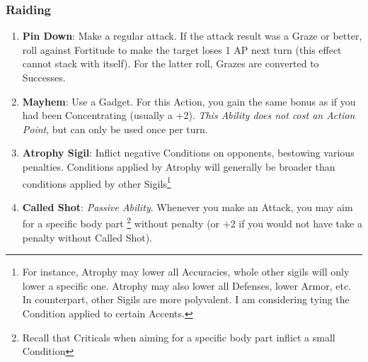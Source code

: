 \subsubsection{Raiding}
\begin{enumerate}
    \item \textbf{Pin Down}: Make a regular attack. If the attack result was a Graze or better, roll against Fortitude to make the target loses 1 AP next turn (this effect cannot stack with itself). For the latter roll, Grazes are converted to Successes.
    \item \textbf{Mayhem}: Use a Gadget. For this Action, you gain the same bonus as if you had been Concentrating (usually a +2). \textit{This Ability does not cost an Action Point}, but can only be used once per turn.
    \item \textbf{Atrophy Sigil}: Inflict negative Conditions on opponents, bestowing various penalties. Conditions applied by Atrophy will generally be broader than conditions applied by other Sigils\footnote{For instance, Atrophy may lower all Accuracies, whole other sigils will only lower a specific one. Atrophy may also lower all Defenses, lower Armor, etc. In counterpart, other Sigils are more polyvalent. I am considering tying the Condition applied to certain Accents.}
    \item \textbf{Called Shot}: \textit{Passive Ability}. Whenever you make an Attack, you may aim for a specific body part \footnote{Recall that Criticals when aiming for a specific body part inflict a small Condition} without penalty (or +2 if you would not have take a penalty without Called Shot).
\end{enumerate}

